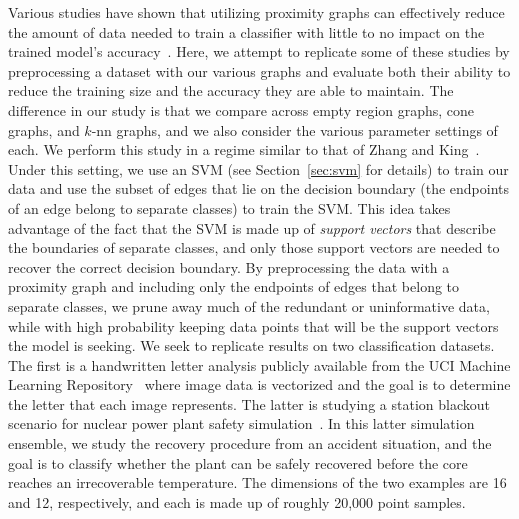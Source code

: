 Various studies have shown that utilizing proximity graphs can effectively reduce the amount of data needed to train a classifier with little to no impact on the trained model's accuracy~\cite{BhattacharyaPoulsenToussaint1981,GotoIshidaUchida2015,Toussaint2005,ToussaintBerzan2012,ZhangKing2002a,ZhangKing2002b}.
%
Here, we attempt to replicate some of these studies by preprocessing a dataset with our various graphs and evaluate both their ability to reduce the training size and the accuracy they are able to maintain.
%
The difference in our study is that we compare across empty region graphs, cone graphs, and $k$-nn graphs, and we also consider the various parameter settings of each.
%
We perform this study in a regime similar to that of Zhang and King~\cite{ZhangKing2002a,ZhangKing2002b}.
%
Under this setting, we use an SVM (see Section~\ref{sec:svm} for details) to train our data and use the subset of edges that lie on the decision boundary (the endpoints of an edge belong to separate classes) to train the SVM.
%
This idea takes advantage of the fact that the SVM is made up of \textit{support vectors} that describe the boundaries of separate classes, and only those support vectors are needed to recover the correct decision boundary.
%
By preprocessing the data with a proximity graph and including only the endpoints of edges that belong to separate classes, we prune away much of the redundant or uninformative data, while with high probability keeping data points that will be the support vectors the model is seeking.
%
We seek to replicate results on two classification datasets.
%
The first is a handwritten letter analysis publicly available from the UCI Machine Learning Repository~\cite{DuaGraff2017} where image data is vectorized and the goal is to determine the letter that each image represents.
%
The latter is studying a station blackout scenario for nuclear power plant safety simulation~\cite{MaljovecLiuWang2015}.
%
In this latter simulation ensemble, we study the recovery procedure from an accident situation, and the goal is to classify whether the plant can be safely recovered before the core reaches an irrecoverable temperature.
%
The dimensions of the two examples are 16 and 12, respectively, and each is made up of roughly 20,000 point samples.

